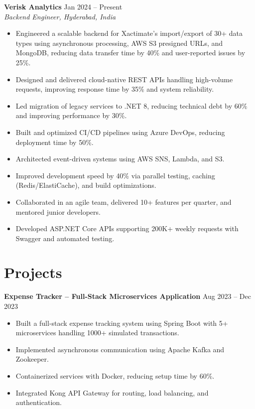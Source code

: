 \documentclass[a4paper,10pt]{article}
\begin{document}
\textbf{Verisk Analytics} \hfill Jan 2024 -- Present \\
\textit{Backend Engineer, Hyderabad, India}
\begin{itemize}[leftmargin=*]
    \item Engineered a scalable backend for Xactimate’s import/export of 30+ data types using asynchronous processing, AWS S3 presigned URLs, and MongoDB, reducing data transfer time by 40\% and user-reported issues by 25\%.
    \item Designed and delivered cloud-native REST APIs handling high-volume requests, improving response time by 35\% and system reliability.
    \item Led migration of legacy services to .NET 8, reducing technical debt by 60\% and improving performance by 30\%.
    \item Built and optimized CI/CD pipelines using Azure DevOps, reducing deployment time by 50\%.
    \item Architected event-driven systems using AWS SNS, Lambda, and S3.
    \item Improved development speed by 40\% via parallel testing, caching (Redis/ElastiCache), and build optimizations.
    \item Collaborated in an agile team, delivered 10+ features per quarter, and mentored junior developers.
    \item Developed ASP.NET Core APIs supporting 200K+ weekly requests with Swagger and automated testing.
\end{itemize}

\section*{Projects}

\textbf{Expense Tracker -- Full-Stack Microservices Application} \hfill Aug 2023 -- Dec 2023
\begin{itemize}[leftmargin=*]
    \item Built a full-stack expense tracking system using Spring Boot with 5+ microservices handling 1000+ simulated transactions.
    \item Implemented asynchronous communication using Apache Kafka and Zookeeper.
    \item Containerized services with Docker, reducing setup time by 60\%.
    \item Integrated Kong API Gateway for routing, load balancing, and authentication.
\end{itemize}
\end{document}

